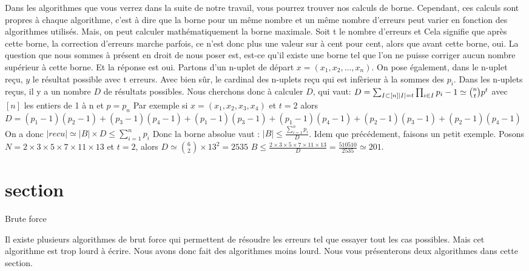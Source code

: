 \documentclass[a4paper, 11pt]{report}
\begin{document}
Dans les algorithmes que vous verrez dans la suite de notre travail, vous pourrez trouver nos calculs de borne. Cependant, ces calculs sont propres à chaque algorithme,
c'est à dire que la borne pour un même nombre et un même nombre d'erreurs peut varier en fonction des algorithmes utilisés. \newline
Mais, on peut calculer mathématiquement la borne maximale. \newline
Soit t le nombre d'erreurs et 
Cela signifie que après cette borne, la correction d'erreurs marche parfois, ce n'est donc plus une valeur sur à cent pour cent, alors que avant cette borne, oui.
\newline
La question que nous sommes à présent en droit de nous poser est, est-ce qu'il existe une borne tel que l'on ne puisse corriger aucun nombre supérieur à cette borne. Et la réponse est oui.
Partons d'un n-uplet de départ $x=(x_1, x_2, ..., x_n)$. On pose également, dans le n-uplet reçu, $y$ le résultat possible avec t erreurs. Avec bien sûr, le cardinal des n-uplets reçu qui est infèrieur à la sommes des $p_i$. Dans les n-uplets reçus, il y a un nombre $D$ de résultats possibles. Nous cherchons donc à calculer $D$, qui vaut: \newline
$D=\sum_{I \subset  [n]  \newline |I|=t  }  \prod _{i \in I} p_i - 1 \simeq  \binom{n}{t} p^t  $ avec $[n]$ les entiers de 1 à n et $p=p_n$\newline
Par exemple si $x=(x_1, x_2, x_3, x_4)$ et $t=2$ alors $D=(p_1-1)(p_2-1)+(p_3-1)(p_4-1)+(p_1-1)(p_3-1)+(p_1-1)(p_4-1)+(p_2-1)(p_3-1)+(p_2-1)(p_4-1)$ \newline
On a donc $ |recu| \simeq |B| \times D\leq \sum_{i = 1}^{n} p_i  $ \newline
Donc la borne absolue vaut : $|B| \leq  \frac{\sum_{i= 1}^{n} p_i }{D} $.\newline
Idem que précédement, faisons un petit exemple. \newline
Posons $N=2\times 3\times 5\times 7\times 11\times 13$ et $t=2$, alors $D\simeq \binom{6}{2}\times 13^2=2535$
$B \leq  \frac{2\times 3\times 5\times 7\times 11\times 13}{D}=\frac{510510}{2535} \simeq 201 $.


\newpage

\chapter{section}{Brute force}

Il existe plusieurs algorithmes de brut force qui permettent de résoudre les erreurs tel que essayer tout les cas possibles. Mais cet algorithme est trop lourd à écrire. Nous avons donc fait des algorithmes moins lourd.
Nous vous présenterons deux algorithmes dans cette section.
\end{document}
